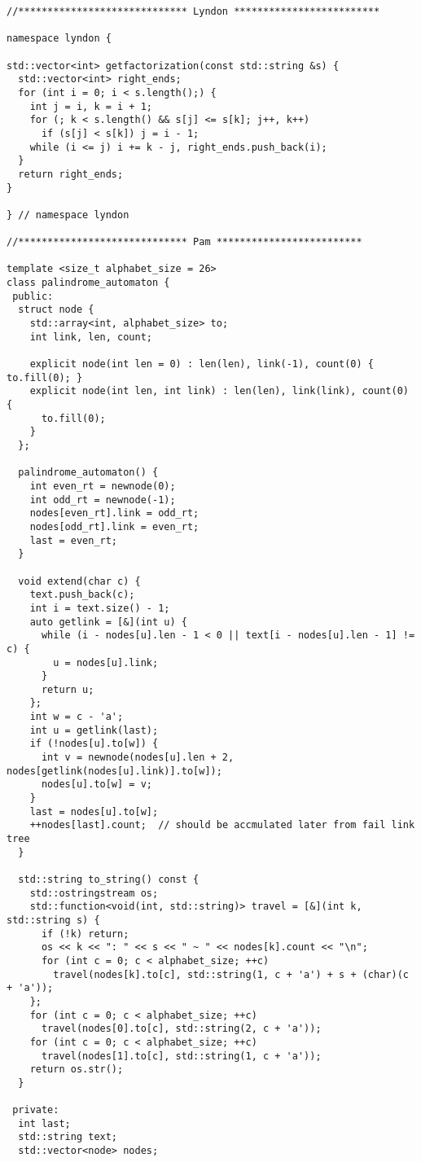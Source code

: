\documentclass[6pt]{article}
\begin{document}
\begin{multicols}{2}
  \begin{lstlisting}
//***************************** Lyndon *************************

namespace lyndon {

std::vector<int> getfactorization(const std::string &s) {
  std::vector<int> right_ends;
  for (int i = 0; i < s.length();) {
    int j = i, k = i + 1;
    for (; k < s.length() && s[j] <= s[k]; j++, k++)
      if (s[j] < s[k]) j = i - 1;
    while (i <= j) i += k - j, right_ends.push_back(i);
  }
  return right_ends;
}

} // namespace lyndon

//***************************** Pam *************************

template <size_t alphabet_size = 26>
class palindrome_automaton {
 public:
  struct node {
    std::array<int, alphabet_size> to;
    int link, len, count;

    explicit node(int len = 0) : len(len), link(-1), count(0) { to.fill(0); }
    explicit node(int len, int link) : len(len), link(link), count(0) {
      to.fill(0);
    }
  };

  palindrome_automaton() {
    int even_rt = newnode(0);
    int odd_rt = newnode(-1);
    nodes[even_rt].link = odd_rt;
    nodes[odd_rt].link = even_rt;
    last = even_rt;
  }

  void extend(char c) {
    text.push_back(c);
    int i = text.size() - 1;
    auto getlink = [&](int u) {
      while (i - nodes[u].len - 1 < 0 || text[i - nodes[u].len - 1] != c) {
        u = nodes[u].link;
      }
      return u;
    };
    int w = c - 'a';
    int u = getlink(last);
    if (!nodes[u].to[w]) {
      int v = newnode(nodes[u].len + 2, nodes[getlink(nodes[u].link)].to[w]);
      nodes[u].to[w] = v;
    }
    last = nodes[u].to[w];
    ++nodes[last].count;  // should be accmulated later from fail link tree
  }

  std::string to_string() const {
    std::ostringstream os;
    std::function<void(int, std::string)> travel = [&](int k, std::string s) {
      if (!k) return;
      os << k << ": " << s << " ~ " << nodes[k].count << "\n";
      for (int c = 0; c < alphabet_size; ++c)
        travel(nodes[k].to[c], std::string(1, c + 'a') + s + (char)(c + 'a'));
    };
    for (int c = 0; c < alphabet_size; ++c)
      travel(nodes[0].to[c], std::string(2, c + 'a'));
    for (int c = 0; c < alphabet_size; ++c)
      travel(nodes[1].to[c], std::string(1, c + 'a'));
    return os.str();
  }

 private:
  int last;
  std::string text;
  std::vector<node> nodes;


\end{lstlisting}
\end{multicols}
\end{document}
